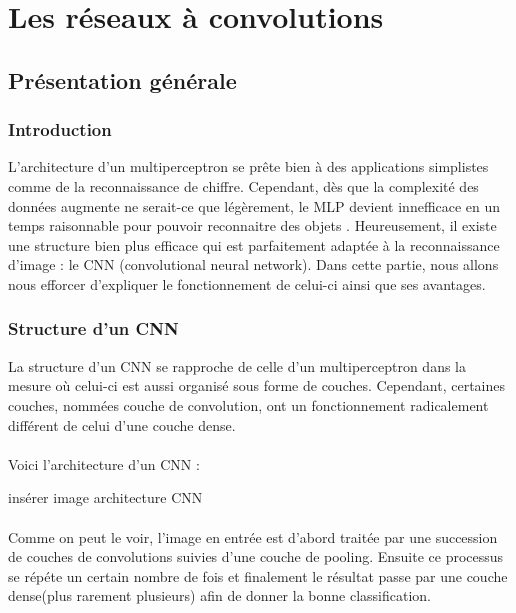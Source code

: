 

\chapter{Les réseaux à convolutions}

\section{Présentation générale}

\subsection{Introduction}
L'architecture d'un multiperceptron se prête bien à des applications simplistes comme de la reconnaissance de chiffre. Cependant, dès que la complexité des données augmente ne serait-ce que légèrement, le MLP devient innefficace en un temps raisonnable pour pouvoir reconnaitre des objets . Heureusement, il existe une structure bien plus efficace qui est parfaitement adaptée à la reconnaissance d'image : le CNN (convolutional neural network). Dans cette partie, nous allons nous efforcer d'expliquer le fonctionnement de celui-ci ainsi que ses avantages. 

\subsection{Structure d'un CNN}
La structure d'un CNN se rapproche de celle d'un multiperceptron dans la mesure où celui-ci est aussi organisé sous forme de couches. Cependant, certaines couches, nommées couche de convolution, ont un fonctionnement radicalement différent de celui d'une couche dense. \\
\\
Voici l'architecture d'un CNN :

{insérer image architecture CNN}\\
\\
Comme on peut le voir, l'image en entrée est d'abord traitée par une succession de couches de convolutions suivies d'une couche de pooling. Ensuite ce processus se répéte un certain nombre de fois et finalement le résultat passe par une couche dense(plus rarement plusieurs) afin de donner la bonne classification.

